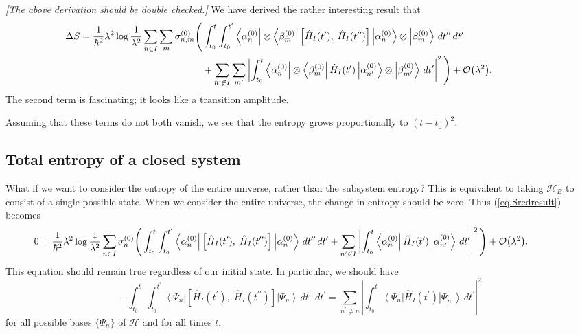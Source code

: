 \documentclass[11pt]{article}
\newcommand{\Od}[1]{\mathcal{O}{\left(#1\right)}}
\newcommand{\bra}[1]{\left\langle#1\right|}
\newcommand{\ket}[1]{\left|#1\right\rangle}
\newcommand{\hilb}{\mathcal{H}}
\newcommand{\op}[1]{\hat{#1}}
\theoremstyle{theorem}
\theoremstyle{remark}
\theoremstyle{step}
\theoremstyle{gap}
\begin{document}
\emph{[The above derivation should be double checked.]}
We have derived the rather interesting result that
\begin{align}\label{eq.Sredresult}
\hspace{-4.5em}
\Delta S =\frac{1}{\hbar^2}\lambda^2 \log\frac{1}{\lambda^2} \sum_{n \in I}\sum_m \sigma_{n,m}^{(0)} \Bigg( &\int_{t_0}^t \int_{t_0}^{t^\prime} \bra{\alpha_n^{(0)}}\otimes\bra{\beta_m^{(0)}}\left[\op{H}_I (t^\prime),\; \op{H}_I(t^{\prime\prime})\right] \ket{\alpha_n^{(0)}}\otimes\ket{\beta_m^{(0)}}\,dt^{\prime\prime}\,dt^\prime \\
&+\sum_{n^\prime \not\in I} \sum_{m^\prime} \left|\int_{t_0}^t \bra{\alpha_{n}^{(0)}}\otimes\bra{\beta_{m}^{(0)}} \op{H}_I (t^{\prime})\ket{\alpha_{n^\prime}^{(0)}}\otimes\ket{\beta_{m^\prime}^{(0)}} \,dt^{\prime}\right|^2 \Bigg) + \Od{\lambda^2}.\nonumber
\end{align}
The second term is fascinating; it looks like a transition amplitude.

Assuming that these terms do not both vanish, we see that the entropy grows proportionally to \(\left(t-t_0\right)^2\).

\subsection{Total entropy of a closed system}

What if we want to consider the entropy of the entire universe, rather than the subsystem entropy? This is equivalent to taking \(\hilb_B\) to consist of a single possible state. When we consider the entire universe, the change in entropy should be zero. Thus (\ref{eq.Sredresult}) becomes
\begin{align*}
\hspace{-3em}
0 =\frac{1}{\hbar^2}\lambda^2 \log\frac{1}{\lambda^2} \sum_{n \in I}\sigma_{n}^{(0)} \Bigg( &\int_{t_0}^t \int_{t_0}^{t^\prime} \bra{\alpha_n^{(0)}}\left[\op{H}_I (t^\prime),\; \op{H}_I(t^{\prime\prime})\right] \ket{\alpha_n^{(0)}}\,dt^{\prime\prime}\,dt^\prime 
+\sum_{n^\prime \not\in I} \left|\int_{t_0}^t \bra{\alpha_{n}^{(0)}} \op{H}_I (t^{\prime})\ket{\alpha_{n^\prime}^{(0)}}\,dt^{\prime}\right|^2 \Bigg) + \Od{\lambda^2}.
\end{align*}
This equation should remain true regardless of our initial state. In particular, we should have
\begin{equation}
-\int_{t_0}^t \int_{t_0}^{t^\prime} \bra{\Psi_n}\left[\op{H}_I (t^\prime),\; \op{H}_I(t^{\prime\prime})\right] \ket{\Psi_n}\,dt^{\prime\prime}\,dt^\prime 
=\sum_{n^\prime \neq n} \left|\int_{t_0}^t \bra{\Psi_n} \op{H}_I (t^{\prime})\ket{\Psi_{n^\prime}}\,dt^{\prime}\right|^2
\end{equation}
for all possible bases \(\{\Psi_n\}\) of \(\hilb\) and for all times \(t\).
\end{document}
